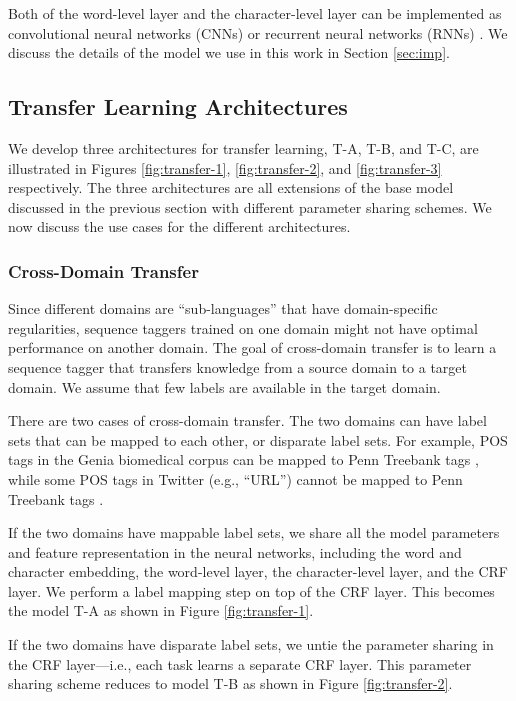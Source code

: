 \documentclass{article} \usepackage{iclr2017_conference,times}
\begin{document}
Both of the word-level layer and the character-level layer can be implemented as convolutional neural networks (CNNs) or recurrent neural networks (RNNs) \citep{collobert2011natural,chiu2015named,lample2016neural,ma2016end}. We discuss the details of the model we use in this work in Section \ref{sec:imp}.

\subsection{Transfer Learning Architectures}

We develop three architectures for transfer learning, T-A, T-B, and T-C, are illustrated in Figures \ref{fig:transfer-1}, \ref{fig:transfer-2}, and \ref{fig:transfer-3} respectively. The three architectures are all extensions of the base model discussed in the previous section with different parameter sharing schemes. We now discuss the use cases for the different architectures.

\subsubsection{Cross-Domain Transfer}

Since different domains are ``sub-languages'' that have domain-specific regularities, sequence taggers trained on one domain might not have optimal performance on another domain. The goal of cross-domain transfer is to learn a sequence tagger that transfers knowledge from a source domain to a target domain. We assume that few labels are available in the target domain.

There are two cases of cross-domain transfer. The two domains can have label sets that can be mapped to each other, or disparate label sets. For example, POS tags in the Genia biomedical corpus can be mapped to Penn Treebank tags \citep{barrett2014token}, while some POS tags in Twitter (e.g., ``URL'') cannot be mapped to Penn Treebank tags \citep{ritter2011named}.

If the two domains have mappable label sets, we share all the model parameters and feature representation in the neural networks, including the word and character embedding, the word-level layer, the character-level layer, and the CRF layer. We perform a label mapping step on top of the CRF layer. This becomes the model T-A as shown in Figure \ref{fig:transfer-1}.

If the two domains have disparate label sets, we untie the parameter sharing in the CRF layer---i.e., each task learns a separate CRF layer. This parameter sharing scheme reduces to model T-B as shown in Figure \ref{fig:transfer-2}.
\end{document}
